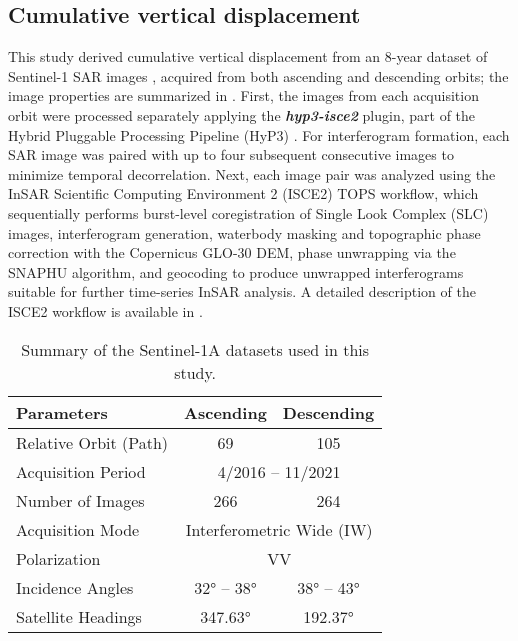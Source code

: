 \subsection{Cumulative vertical displacement}
\label{subsubsec:vert_disp}


This study derived cumulative vertical displacement from an 8-year dataset of Sentinel-1 SAR images , acquired from both ascending and descending orbits; the image properties are summarized in . First, the images from each acquisition orbit were processed separately applying the \textbf{\textit{hyp3-isce2}} plugin, part of the Hybrid Pluggable Processing Pipeline (HyP3) \citep{hyp3-isce2}. For interferogram formation, each SAR image was paired with up to four subsequent consecutive images to minimize temporal decorrelation. Next, each image pair was analyzed using the InSAR Scientific Computing Environment 2 (ISCE2) TOPS workflow, which sequentially performs burst-level coregistration of Single Look Complex (SLC) images, interferogram generation, waterbody masking and topographic phase correction with the Copernicus GLO-30 DEM, phase unwrapping via the SNAPHU algorithm, and geocoding to produce unwrapped interferograms suitable for further time-series InSAR analysis. A detailed description of the ISCE2 workflow is available in \citep{isce2_rosen, tops, nesd_tops}.

\begin{table}[H]
	\centering
	\caption{Summary of the Sentinel-1A datasets used in this study.}
	\label{tab:sentinel1_info}
	
	\begin{tabular}{lcc}
		\toprule
		\textbf{Parameters} & \textbf{Ascending} & \textbf{Descending} \\
		\midrule
		Relative Orbit (Path) & 69 & 105 \\
		\multicolumn{1}{l}{Acquisition Period} & \multicolumn{2}{c}{4/2016 – 11/2021} \\
		Number of Images      & 266 & 264 \\
		\multicolumn{1}{l}{Acquisition Mode} & \multicolumn{2}{c}{Interferometric Wide (IW)} \\
		\multicolumn{1}{l}{Polarization} & \multicolumn{2}{c}{VV} \\
		Incidence Angles & 32° – 38° & 38° – 43° \\
		Satellite Headings & 347.63° & 192.37° \\
		\bottomrule
	\end{tabular}
\end{table}

